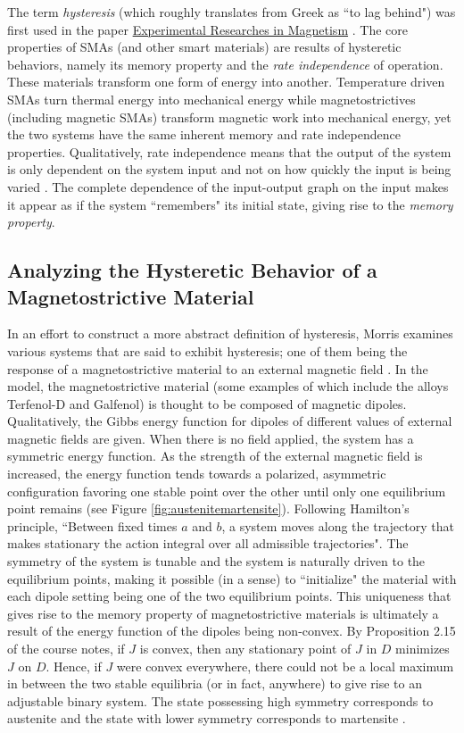 \begin{multicols}{2}
The term \emph{hysteresis} (which roughly translates from Greek as ``to lag behind") was first used in the paper \underline{Experimental Researches in Magnetism} \cite{morris2011hysteresis}. The core properties of SMAs (and other smart materials) are results of hysteretic behaviors, namely its memory property and the \emph{rate independence} of operation. These materials transform one form of energy into another. Temperature driven SMAs turn thermal energy into mechanical energy while magnetostrictives (including magnetic SMAs) transform magnetic work into mechanical energy, yet the two systems have the same inherent memory and rate independence properties. Qualitatively, rate independence means that the output of the system is only dependent on the system input and not on how quickly the input is being varied \cite{morris2011hysteresis}. The complete dependence of the input-output graph on the input makes it appear as if the system ``remembers" its initial state, giving rise to the \emph{memory property}. 


\subsection{Analyzing the Hysteretic Behavior of a Magnetostrictive Material}
In an effort to construct a more abstract definition of hysteresis, Morris examines various systems that are said to exhibit hysteresis; one of them being the response of a magnetostrictive material to an external magnetic field \cite{morris2011hysteresis}. In the model, the magnetostrictive material (some examples of which include the alloys Terfenol-D and Galfenol) is thought to be composed of magnetic dipoles. Qualitatively, the Gibbs energy function for dipoles of different values of external magnetic fields are given. When there is no field applied, the system has a symmetric energy function. As the strength of the external magnetic field is increased, the energy function tends towards a polarized, asymmetric configuration favoring one stable point over the other until only one equilibrium point remains (see Figure \ref{fig:austenitemartensite}). Following Hamilton's principle, ``Between fixed times $a$ and $b$, a system moves along the trajectory that makes stationary the action integral over all admissible trajectories"\cite{coursenotes}. The symmetry of the system is tunable and the system is naturally driven to the equilibrium points, making it possible (in a sense) to ``initialize" the material with each dipole setting being one of the two equilibrium points. This uniqueness that gives rise to the memory property of magnetostrictive materials is ultimately a result of the energy function of the dipoles being non-convex. By Proposition 2.15 of the course notes, if $J$ is convex, then any stationary point of $J$ in $D$ minimizes $J$ on $D$.\cite{coursenotes} Hence, if $J$ were convex everywhere, there could not be a local maximum in between the two stable equilibria (or in fact, anywhere) to give rise to an adjustable binary system. The state possessing high symmetry corresponds to austenite and the state with lower symmetry corresponds to martensite \cite{smith2005smart}.


\end{multicols}
